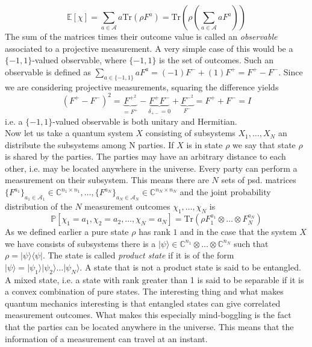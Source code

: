 \begin{equation}
\mathbb{E}\left[ \chi \right] = \sum_{a \in \mathcal{A}} a \text{Tr}(\rho F^a) = \text{Tr} ( \rho ( \sum_{a \in \mathcal{A}} a F^a))
\end{equation}
The sum of the matrices times their outcome value is called an \emph{observable} associated to a projective measurement. A very simple case of this would be a $\{ -1, 1 \}$-valued observable, where $\{ -1, 1 \}$ is the set of outcomes. 
Such an observable is defined as $\sum_{a \in \{ -1, 1 \} } a F^a = (-1)F^- + (1)F^+ = F^+ - F^-$. Since we are considering projective measurements, squaring the difference yields
\begin{equation}
(F^+-F^-)^2 = \underbrace{F^{+^2}}_{= F^+}- \underbrace{F^+F^-}_{\delta_{+-}=0} + \underbrace{F^{-^2}}_{F^-} = F^+ + F^- = I
\end{equation}
i.e.  a $\{ -1, 1 \}$-valued observable is both unitary and Hermitian.\\
Now let us take a quantum system $X$ consisting of subsystems $X_1, \dots, X_N$ an distribute the subsystems among N parties. If $X$ is in state $\rho$ we say that state $\rho$ is shared by the parties. The parties may have an arbitrary distance to each other, i.e. may be located anywhere in the universe. Every party can perform a measurement on their subsystem. This means there are $N$ sets of psd. matrices $\{F^{a_1}\}_{a_1 \in \mathcal{A}_1} \in \mathbb{C}^{n_1 \times n_1}, \dots, \{F^{a_N}\}_{a_N \in \mathcal{A}_N} \in \mathbb{C}^{n_N \times n_N}$ and the joint probability distribution of the $N$ measurement outcomes $\chi_1 , \dots , \chi_N$ is 
\begin{equation}
\mathbb{P}\left[ \chi_1 = a_1, \chi_2 = a_2, \dots , \chi_N = a_N \right] = \text{Tr}(\rho F_1^{a_1} \otimes \dots \otimes F_N^{a_N}) 
\end{equation}
As we defined earlier a pure state $\rho$ has rank $1$ and in the case that the system $X$ we have consists of subsystems there is a $\vert \psi \rangle \in \mathbb{C}^{n_1}\otimes \dots \otimes \mathbb{C}^{n_N}$ such that $\rho = \vert \psi \rangle \langle \psi \vert$. The state is called \emph{product state} if it is of the form $\vert \psi \rangle = \vert \psi_1 \rangle \vert \psi_2 \rangle \dots \vert \psi_N \rangle$. A state that is not a product state is said to be entangled. A mixed state, i.e. a state with rank greater than 1 is said to be separable if it is a convex combination of pure states. The interesting thing and what makes quantum mechanics interesting is that entangled states can give correlated measurement outcomes. What makes this especially mind-boggling is the fact that the parties can be located anywhere in the universe. This means that the information of a measurement can travel at an instant.\\
